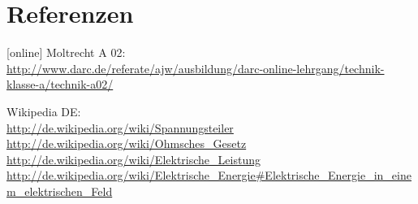 \section{Referenzen}
\begin{small}
  \begin{thebibliography}{}
      [online]
      Moltrecht A 02: \\
      \url{http://www.darc.de/referate/ajw/ausbildung/darc-online-lehrgang/technik-klasse-a/technik-a02/}

        Wikipedia DE: \\
      \url{http://de.wikipedia.org/wiki/Spannungsteiler}\\
      \url{http://de.wikipedia.org/wiki/Ohmsches_Gesetz}\\
      \url{http://de.wikipedia.org/wiki/Elektrische_Leistung}\\
      \url{http://de.wikipedia.org/wiki/Elektrische_Energie#Elektrische_Energie_in_einem_elektrischen_Feld}\\
  \end{thebibliography}
\end{small}



